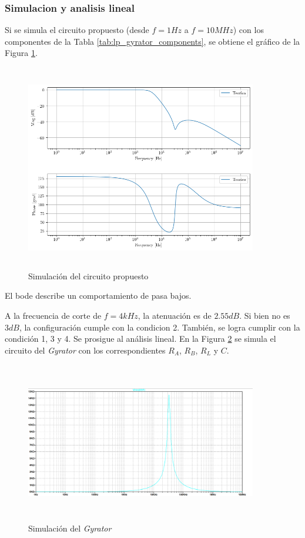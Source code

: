 \documentclass[12pt,a4paper]{article}
\begin{document}
\subsubsection{Simulacion y analisis lineal}
Si se simula el circuito propuesto (desde $f = 1 Hz$ a $f = 10MHz$) con los componentes de la Tabla \ref{tab:lp_gyrator_components}, se obtiene el gráfico de la Figura \ref{ej2_lp_sim}.

\begin{figure}[h!]                                                       
\centering\includegraphics[width=0.9\textwidth, height=9cm]{Resources/ej2_lp_sim.png}
\caption{Simulación del circuito propuesto }
\label{ej2_lp_sim}
\end{figure}

El bode describe un comportamiento de pasa bajos. 


A la frecuencia de corte de $f= 4kHz$, la atenuación es de $2.55 dB$. Si bien no es $3dB$, la configuración cumple con la condicion 2.  También, se logra cumplir con la condición 1, 3 y 4. Se prosigue al análisis lineal. En la Figura \ref{fig:ej2_LP_gyrator_sim} se simula el circuito del \textit{Gyrator} con los correspondientes  $R_A$, $R_B$,  $R_L$ y $C$.



\begin{figure}[h!]                                                       
\centering\includegraphics[width=0.9\textwidth, height=7cm]{Resources/ej2_lp_gyrator_sim.png}
\caption{Simulación del \textit{Gyrator} }
\label{fig:ej2_LP_gyrator_sim}
\end{figure}
\end{document}
